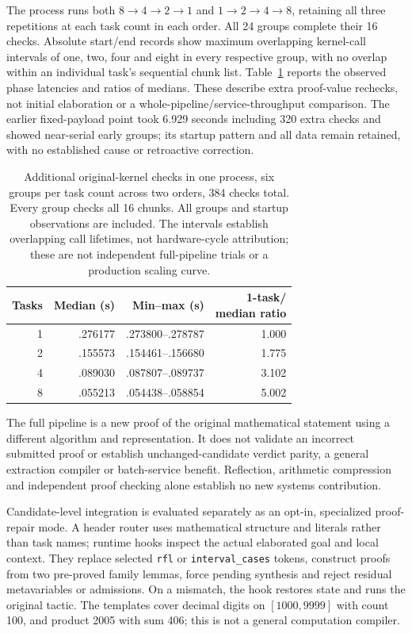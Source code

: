 \documentclass[10pt,twocolumn]{article}
\begin{document}
The process runs both $8\to4\to2\to1$ and $1\to2\to4\to8$, retaining all
three repetitions at each task count in each order. All 24 groups complete
their 16 checks. Absolute start/end records show maximum overlapping
kernel-call intervals of one, two, four and eight in every respective
group, with no overlap within an individual task's sequential chunk list.
Table~\ref{tab:reflected-grid-groups} reports the observed phase latencies
and ratios of medians. These describe extra proof-value rechecks, not
initial elaboration or a whole-pipeline/service-throughput comparison.
The earlier fixed-payload point took 6.929 seconds including 320 extra
checks and showed near-serial early groups; its startup pattern and all
data remain retained, with no established cause or retroactive correction.

\begin{table}[t]
\centering
\small
\setlength{\tabcolsep}{3pt}
\begin{tabular}{rrrr}
\toprule
Tasks & Median (s) & Min--max (s) & \shortstack{1-task/\\median ratio} \\
\midrule
1 & .276177 & .273800--.278787 & 1.000 \\
2 & .155573 & .154461--.156680 & 1.775 \\
4 & .089030 & .087807--.089737 & 3.102 \\
8 & .055213 & .054438--.058854 & 5.002 \\
\bottomrule
\end{tabular}
\caption{Additional original-kernel checks in one process, six groups per
task count across two orders, 384 checks total. Every group checks all 16
chunks. All groups and startup observations are included. The intervals
establish overlapping call lifetimes, not hardware-cycle attribution;
these are not independent full-pipeline trials or a production scaling curve.}
\label{tab:reflected-grid-groups}
\end{table}

The full pipeline is a new proof of the original mathematical statement
using a different algorithm and representation. It does not validate an
incorrect submitted proof or establish unchanged-candidate verdict parity,
a general extraction compiler or batch-service benefit. Reflection, arithmetic compression and independent proof checking
alone establish no new systems contribution.

Candidate-level integration is evaluated separately as an opt-in,
specialized proof-repair mode. A header router uses mathematical structure
and literals rather than task names; runtime hooks inspect the actual
elaborated goal and local context. They replace selected \texttt{rfl} or
\texttt{interval\_cases} tokens, construct proofs from two pre-proved family
lemmas, force pending synthesis and reject residual metavariables or
admissions. On a mismatch, the hook restores state and runs the original
tactic. The templates cover decimal digits on $[1000,9999]$ with count 100,
and product 2005 with sum 406; this is not a general computation compiler.
\end{document}
